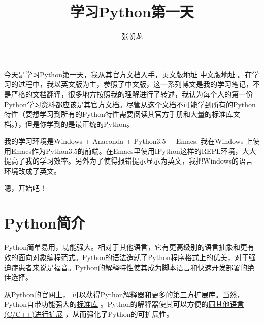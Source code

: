 \documentclass[10pt,a4paper,UTF8]{article}
\author{张朝龙}
\date{}
\title{学习Python第一天}
\begin{document}
\maketitle
\tableofcontents
{}
\newpage

今天是学习Python第一天，我从其官方文档入手，\href{https://docs.python.org/3.5/tutorial/index.html}{英文版地址} \href{http://docspy3zh.readthedocs.io/en/latest/tutorial/}{中文版地址} 。在学习的过程中，我以英文版为主，参照了中文版，这一系列博文是我的学习笔记，不是严格的文档翻译，很多地方按照我的理解进行了转述，我认为每个人的第一份Python学习资料都应该是其官方文档。尽管从这个文档不可能学到所有的Python特性（要想学习到所有的Python特性需要阅读其官方手册和大量的标准库文档。），但是你学到的是最正统的Python。

我的学习环境是Windows + Anaconda + Python3.5 + Emacs. 我在Windows 上使用Emacs作为Python3.5的前端。在Emacs里使用IPython这样的REPL环境，大大提高了我的学习效率。另外为了使得报错提示显示为英文，我把Windows的语言环境改成了英文。

嗯，开始吧！

\section{Python简介}
\label{sec:orgheadline1}


Python简单易用，功能强大。相对于其他语言，它有更高级别的语言抽象和更有效的面向对象编程范式。Python的语法造就了Python程序格式上的优美，对于强迫症患者来说是福音。Python的解释特性使其成为脚本语言和快速开发部署的绝佳选择。

从\href{https://www.python.org/}{Python的官网}上， 可以获得Python解释器和更多的第三方扩展库。当然，Python自带功能强大的\href{https://docs.python.org/3.5/library/index.html#library-index}{标准库} 。Python的解释器使其可以方便的\href{https://docs.python.org/3.5/extending/index.html#extending-index}{同其他语言(C/C++)进行扩展} ，从而强化了Python的可扩展性。
\end{document}
